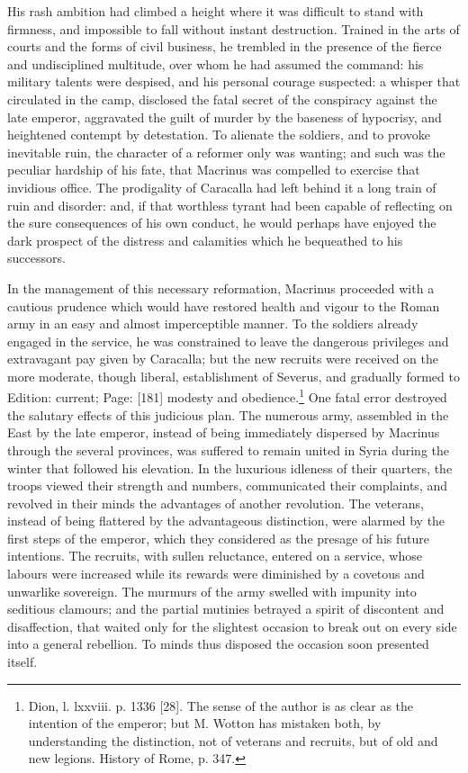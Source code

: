 His rash ambition had climbed a height where it was difficult to stand with firmness, and impossible to fall without instant destruction. Trained in the arts of courts and the forms of civil business, he trembled in the presence of the fierce and undisciplined multitude, over whom he had assumed the command: his military talents were despised, and his personal courage suspected: a whisper that circulated in the camp, disclosed the fatal secret of the conspiracy against the late emperor, aggravated the guilt of murder by the baseness of hypocrisy, and heightened contempt by detestation. To alienate the soldiers, and to provoke inevitable ruin, the character of a reformer only was wanting; and such was the peculiar hardship of his fate, that Macrinus was compelled to exercise that invidious office. The prodigality of Caracalla had left behind it a long train of ruin and disorder: and, if that worthless tyrant had been capable of reflecting on the sure consequences of his own conduct, he would perhaps have enjoyed the dark prospect of the distress and calamities which he bequeathed to his successors.

In the management of this necessary reformation, Macrinus proceeded with a cautious prudence which would have restored health and vigour to the Roman army in an easy and almost imperceptible manner. To the soldiers already engaged in the service, he was constrained to leave the dangerous privileges and extravagant pay given by Caracalla; but the new recruits were received on the more moderate, though liberal, establishment of Severus, and gradually formed to Edition: current; Page: [181] modesty and obedience.\footnote{Dion, l. lxxviii. p. 1336 [28]. The sense of the author is as clear as the intention of the emperor; but M. Wotton has mistaken both, by understanding the distinction, not of veterans and recruits, but of old and new legions. History of Rome, p. 347.} One fatal error destroyed the salutary effects of this judicious plan. The numerous army, assembled in the East by the late emperor, instead of being immediately dispersed by Macrinus through the several provinces, was suffered to remain united in Syria during the winter that followed his elevation. In the luxurious idleness of their quarters, the troops viewed their strength and numbers, communicated their complaints, and revolved in their minds the advantages of another revolution. The veterans, instead of being flattered by the advantageous distinction, were alarmed by the first steps of the emperor, which they considered as the presage of his future intentions. The recruits, with sullen reluctance, entered on a service, whose labours were increased while its rewards were diminished by a covetous and unwarlike sovereign. The murmurs of the army swelled with impunity into seditious clamours; and the partial mutinies betrayed a spirit of discontent and disaffection, that waited only for the slightest occasion to break out on every side into a general rebellion. To minds thus disposed the occasion soon presented itself.

